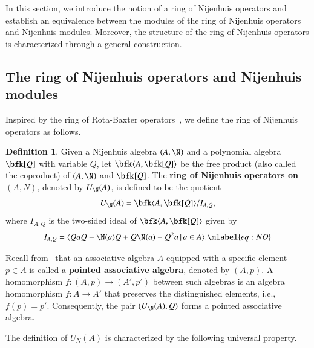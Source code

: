\documentclass[12pt]{amsart}
\theoremstyle{definition}
\newtheorem{defn}[theorem]{Definition}
\begin{document}
In this section, we introduce the notion of a ring of Nijenhuis operators and establish an equivalence between the modules of the ring of Nijenhuis operators and Nijenhuis modules. Moreover, the structure of the ring of Nijenhuis operators is characterized through a general construction.

\subsection{The ring of Nijenhuis operators and Nijenhuis modules} 

Inspired by the ring of Rota-Baxter operators~, we define the ring of Nijenhuis operators as follows. 

\begin{defn}
Given a Nijenhuis algebra $(A,\N)$ and a polynomial algebra $ \bfk[Q]$ with variable $Q$, let $\bfk\langle A,\bfk[Q]\rangle$ be the free product (also called the coproduct) of $(A,\N)$ and $ \bfk[Q]$.  The {\bf ring of Nijenhuis operators on $(A,N)$}, denoted by $U_{\N}(A)$, is defined to be  the quotient
\[ U_{\N}(A)=\bfk\langle A,\bfk[Q]\rangle /I_{A,Q},\]
where $I_{A,Q}$ is the two-sided ideal of $\bfk\langle A, \bfk[Q]\rangle $ given by
\begin{equation}
I_{A,Q}=\langle QaQ-\N(a)Q+Q \N(a)-Q^2 a \, |\,  a\in A \rangle.
\mlabel{eq:NO}
\end{equation}

\end{defn}

Recall from~ that an associative algebra $A$ equipped with a specific element $p \in A$ is called a {\bf pointed associative algebra}, denoted by $(A, p)$. A homomorphism $f: (A, p) \rightarrow (A', p')$ between such algebras is an algebra homomorphism $f: A \rightarrow A'$ that preserves the distinguished elements, i.e., $f(p) = p'$. Consequently, the pair $(U_{\N}(A), Q)$ forms a pointed associative algebra.

The definition of $U_{N}(A)$ is characterized by the following universal property. 
\end{document}
